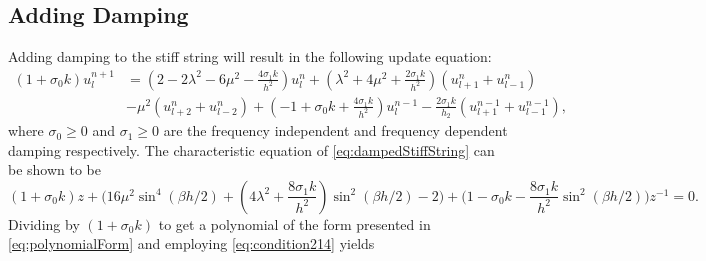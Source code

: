 \documentclass{article}
\begin{document}
\subsection{Adding Damping}
Adding damping to the stiff string will result in the following update equation:
\begin{equation}\label{eq:dampedStiffString}
    \begin{aligned}
    (1+\sigma_0k)u_l^{n+1} &= (2-2\lambda^2-6\mu^2-\frac{4\sigma_1k}{h^2})u_l^n +(\lambda^2 + 4\mu^2 + \frac{2\sigma_1k}{h^2})(u_{l+1}^n+u_{l-1}^n)\\
    &-\mu^2(u_{l+2}^n+u_{l-2}^n)+(-1 + \sigma_0k+\frac{4\sigma_1k}{h^2})u_l^{n-1} -\frac{2\sigma_1k}{h_2}(u_{l+1}^{n-1}+u_{l-1}^{n-1}),
    \end{aligned}
\end{equation}
where $\sigma_0 \geq 0$ and $\sigma_1\geq0$ are the frequency independent and frequency dependent damping respectively. The characteristic equation of \eqref{eq:dampedStiffString} can be shown to be
\begin{equation}
    (1+\sigma_0k)z + \bigg(16\mu^2\sin^4(\beta h/2)+(4\lambda^2+\frac{8\sigma_1k}{h^2})\sin^2(\beta h/2) - 2\bigg)+\bigg(1-\sigma_0k-\frac{8\sigma_1k}{h^2}\sin^2(\beta h/2)\bigg)z^{-1}=0.
\end{equation}
Dividing by $(1+\sigma_0k)$ to get a polynomial of the form presented in \eqref{eq:polynomialForm} and employing \eqref{eq:condition214} yields
\end{document}
